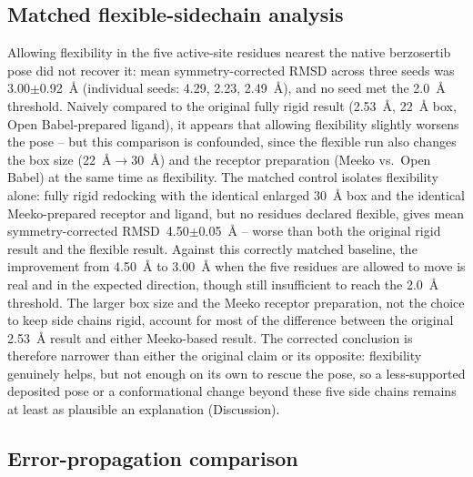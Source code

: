 \documentclass[global,twocolumn]{svjour}
\begin{document}
\subsection{Matched flexible-sidechain analysis}

Allowing flexibility in the five active-site residues nearest the native
berzosertib pose did not recover it: mean symmetry-corrected RMSD across
three seeds was 3.00$\pm$0.92~\AA{} (individual seeds: 4.29, 2.23,
2.49~\AA{}), and no seed met the 2.0~\AA{} threshold. Naively compared to
the original fully rigid result (2.53~\AA{}, 22~\AA{} box, Open
Babel-prepared ligand), it appears that allowing flexibility slightly
worsens the pose -- but this comparison is confounded, since the flexible
run also changes the box size (22~\AA{}$\to$30~\AA{}) and the receptor
preparation (Meeko vs.\ Open Babel) at the same time as flexibility. The
matched control isolates flexibility alone: fully rigid redocking with the
identical enlarged 30~\AA{} box and the identical Meeko-prepared receptor
and ligand, but no residues declared flexible, gives mean
symmetry-corrected RMSD~4.50$\pm$0.05~\AA{} -- worse than both the
original rigid result and the flexible result. Against this correctly
matched baseline, the improvement from 4.50~\AA{} to 3.00~\AA{} when the
five residues are allowed to move is real and in the expected direction,
though still insufficient to reach the 2.0~\AA{} threshold. The larger box
size and the Meeko receptor preparation, not the choice to keep side
chains rigid, account for most of the difference between the original
2.53~\AA{} result and either Meeko-based result. The corrected conclusion
is therefore narrower than either the original claim or its opposite:
flexibility genuinely helps, but not enough on its own to rescue the pose,
so a less-supported deposited pose or a conformational change beyond
these five side chains remains at least as plausible an explanation
(Discussion).

\subsection{Error-propagation comparison}
\end{document}
